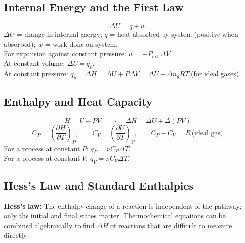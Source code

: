 \documentclass[12pt,a4paper]{article}
\begin{document}
\subsection{Internal Energy and the First Law}
\begin{tcolorbox}[formulabox, title={First Law of Thermodynamics}]
\[
\Delta U = q + w
\]
$\Delta U$ = change in internal energy; $q$ = heat absorbed by system (positive when absorbed); $w$ = work done on system.\\
For expansion against constant pressure: $w = -P_{\mathrm{ext}}\,\Delta V$.\\
At constant volume: $\Delta U = q_v$.\\
At constant pressure: $q_p = \Delta H = \Delta U + P\Delta V = \Delta U + \Delta n_g RT$ (for ideal gases).
\end{tcolorbox}

\subsection{Enthalpy and Heat Capacity}
\begin{tcolorbox}[formulabox, title={Enthalpy and Heat Capacity Relations}]
\[
H = U + PV \quad\Rightarrow\quad \Delta H = \Delta U + \Delta(PV)
\]
\[
C_P = \left(\frac{\partial H}{\partial T}\right)_P, \qquad C_V = \left(\frac{\partial U}{\partial T}\right)_V, \qquad C_P - C_V = R\ \text{(ideal gas)}
\]
For a process at constant $P$: $q_P = n C_P \Delta T$.\\
For a process at constant $V$: $q_V = n C_V \Delta T$.
\end{tcolorbox}

\subsection{Hess's Law and Standard Enthalpies}
\begin{tcolorbox}[defbox]
\textbf{Hess's law:} The enthalpy change of a reaction is independent of the pathway; only the initial and final states matter. Thermochemical equations can be combined algebraically to find $\Delta H$ of reactions that are difficult to measure directly.
\end{tcolorbox}

\begin{tcolorbox}[tikzbox, title={Hess's Law Energy Cycle for Combustion of Carbon}]
\centering
{}
\end{tcolorbox}
\end{document}
